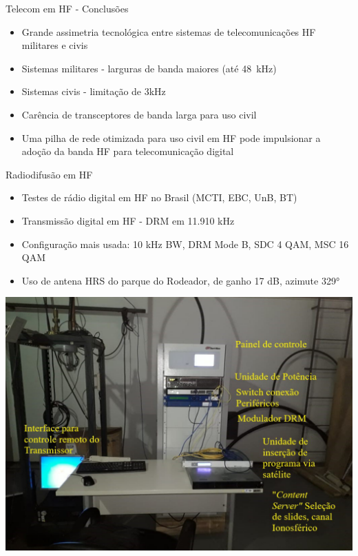 \begin{frame}

\begin{block}{Telecom em HF - Conclusões}

  \begin{itemize}
  \item Grande assimetria tecnológica entre sistemas de telecomunicações HF
    militares e civis
  \item Sistemas militares - larguras de banda maiores (até 48~kHz)
  \item Sistemas civis - limitação de 3kHz
  \item Carência de transceptores de banda larga para uso civil
  \item Uma pilha de rede otimizada para uso civil em HF pode impulsionar a
    adoção da banda HF para telecomunicação digital
\end{itemize}
\end{block}

\end{frame}


\begin{frame}
\begin{block}{Radiodifusão em HF}


  \begin{itemize}
  \item Testes de rádio digital em HF no Brasil (MCTI, EBC, UnB, BT)
  \item Transmissão digital em HF - DRM em 11.910 kHz
  \item Configuração mais usada: 10 kHz BW, DRM Mode B, SDC 4 QAM, MSC 16 QAM
  \item Uso de antena HRS do parque do Rodeador, de ganho 17 dB, azimute 329°
  \end{itemize}
\end{block}

\end{frame}


\begin{frame}

  \begin{center}
    \includegraphics[width=.75\columnwidth]{im1.jpg}
  \end{center}


\end{frame}

